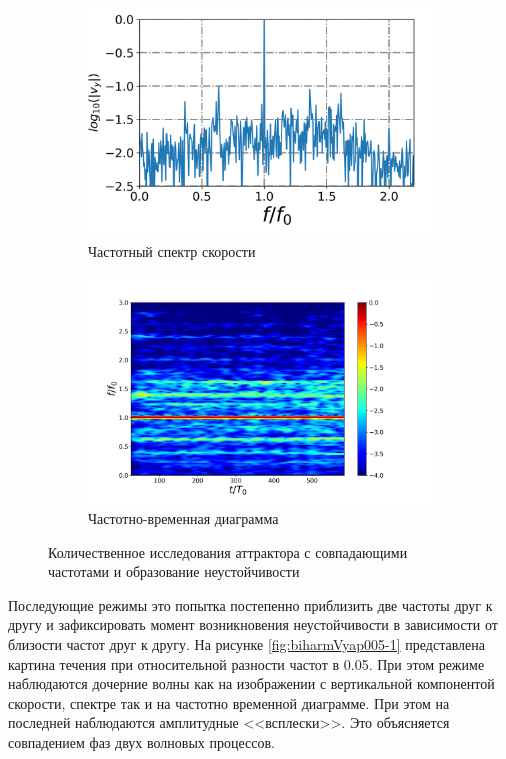 \begin{figure}
\begin{subfigure}[с]{0.45\textwidth}
	    \includegraphics[width=1\textwidth]{pics/H40L60N1ap10dp20w0p63/spectrumX35p6Y11p2n4000.png}
	    \caption{Частотный спектр скорости}
	\end{subfigure}
	\begin{subfigure}[с]{0.45\textwidth}
	    \includegraphics[width=1\textwidth]{pics/H40L60N1ap10dp20w0p63/TFspectrumX35p6Y11p2N1024.png}
	    \caption{Частотно-временная диаграмма}
	\end{subfigure}
	\label{fig:Vyamp1-1}
	\caption{Количественное исследования аттрактора с совпадающими частотами и образование неустойчивости}
	\label{fig:Vyamp1}
\end{figure}

Последующие режимы это попытка постепенно приблизить две частоты друг к другу и зафиксировать момент возникновения неустойчивости в зависимости от близости частот друг к другу. На рисунке \ref{fig:biharmVyap005-1} представлена картина течения при относительной разности частот в 0.05. При этом режиме наблюдаются дочерние волны как на изображении с вертикальной компонентой скорости, спектре так и на частотно временной диаграмме. При этом на последней наблюдаются  амплитудные <<всплески>>. Это объясняется совпадением фаз двух волновых процессов.

